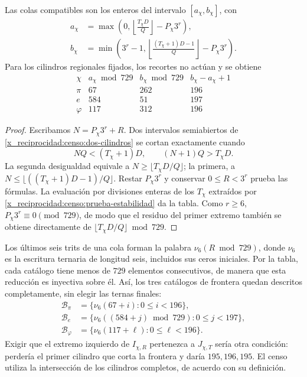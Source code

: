 \begin{proposition}
\label{x_reciprocidad:censo:catalogos}
Las colas compatibles son los enteros del intervalo \([a_\chi,b_\chi]\),
con
\begin{align}
 a_\chi&=\max\left(0,
       \left\lfloor\frac{T_\chi D}{Q}\right\rfloor-P_\chi3^r\right),
       \label{x_reciprocidad:censo:extremo-a}\\
 b_\chi&=\min\left(3^r-1,
       \left\lfloor\frac{(T_\chi+1)D-1}{Q}\right\rfloor-P_\chi3^r\right).
       \label{x_reciprocidad:censo:extremo-b}
\end{align}
Para los cilindros regionales fijados, los recortes no actúan y se obtiene
\begin{equation}
\begin{array}{c|r|r|r}
 \chi&a_\chi\bmod729&b_\chi\bmod729&b_\chi-a_\chi+1\\\hline
 \pi&67&262&196\\
 e&584&51&197\\
 \varphi&117&312&196
\end{array}
\label{x_reciprocidad:censo:tabla-catalogos}
\end{equation}
\end{proposition}
\begin{proof}
Escribamos \(N=P_\chi3^r+R\). Dos intervalos semiabiertos de
\eqref{x_reciprocidad:censo:dos-cilindros} se cortan exactamente cuando
\[
 NQ<(T_\chi+1)D,\qquad (N+1)Q>T_\chi D.
\]
La segunda desigualdad equivale a
\(N\geq\lfloor T_\chi D/Q\rfloor\); la primera, a
\(N\leq\lfloor((T_\chi+1)D-1)/Q\rfloor\). Restar
\(P_\chi3^r\) y conservar \(0\leq R<3^r\) prueba las fórmulas.
La evaluación por divisiones enteras de los \(T_\chi\) extraídos por
\eqref{x_reciprocidad:censo:prueba-estabilidad} da la tabla. Como \(r\geq6\),
\(P_\chi3^r\equiv0\pmod{729}\), de modo que el residuo del primer
extremo también se obtiene directamente de
\(\lfloor T_\chi D/Q\rfloor\bmod729\).
\end{proof}

Los últimos seis trits de una cola forman la palabra
\(\nu_6(R\bmod729)\), donde \(\nu_6\) es la escritura ternaria
de longitud seis, incluidos sus ceros iniciales. Por la tabla, cada
catálogo tiene menos de \(729\) elementos consecutivos, de manera que
esta reducción es inyectiva sobre él. Así, los tres catálogos de frontera
quedan descritos completamente, sin elegir las ternas finales:
\begin{equation}
 \begin{split}
 \mathcal B_\pi&=\{\nu_6(67+i):0\leq i<196\},\\
 \mathcal B_e&=\{\nu_6((584+j)\bmod729):0\leq j<197\},\\
 \mathcal B_\varphi&=\{\nu_6(117+\ell):0\leq\ell<196\}.
 \end{split}
 \label{x_reciprocidad:censo:fronteras-explicitas}
\end{equation}
Exigir que el extremo izquierdo de \(I_{\chi,R}\) pertenezca a
\(J_{\chi,T}\) sería otra condición: perdería el primer cilindro
que corta la frontera y daría \(195,196,195\). El censo utiliza la
intersección de los cilindros completos, de acuerdo con su definición.

